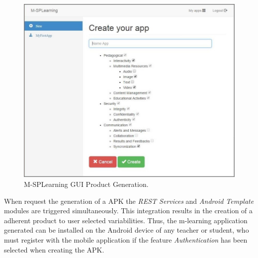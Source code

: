 
\begin{figure}[!ht]
\centering
\includegraphics[scale=0.45]{figures/section3/MSPLWebGeneration}
\caption{M-SPLearning GUI Product Generation.}
\label{figureMSPLWebGeneration}
\end{figure}

When request the generation of a APK the \textit{REST Services} and \textit{Android Template} modules are triggered simultaneously. This integration results in the creation of a adherent product to user selected variabilities. Thus, the m-learning application generated can be installed on the Android device of any teacher or student, who must register with the mobile application if the feature \textit{Authentication} has been selected when creating the APK.

